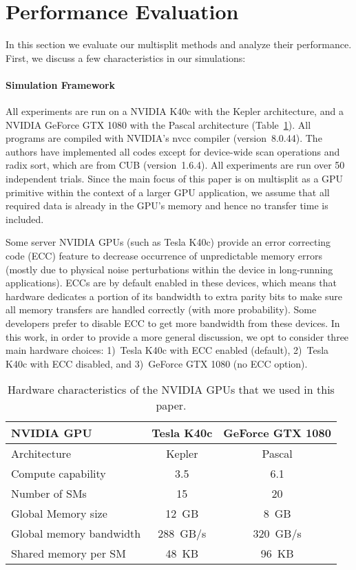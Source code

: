 \section{Performance Evaluation}\label{sec:perf_eval}
In this section we evaluate our multisplit methods and analyze their performance. First, we discuss a few characteristics in our simulations:

\paragraph{Simulation Framework}
All experiments are run on a NVIDIA K40c with the Kepler architecture, and a NVIDIA GeForce GTX 1080 with the Pascal architecture (Table~\ref{table:gpus}).
All programs are compiled with NVIDIA's nvcc compiler (version~8.0.44).
The authors have implemented all codes except for device-wide scan operations and radix sort, which are from CUB (version~1.6.4).
All experiments are run over 50 independent trials.
Since the main focus of this paper is on multisplit as a GPU primitive within the context of a larger GPU application, we assume that all required data is already in the GPU's memory and hence no transfer time is included.

Some server NVIDIA GPUs (such as Tesla K40c) provide an error correcting code (ECC) feature to decrease occurrence of unpredictable memory errors (mostly due to physical noise perturbations within the device in long-running applications).
ECCs are by default enabled in these devices, which means that hardware dedicates a portion of its bandwidth to extra parity bits to make sure all memory transfers are handled correctly (with more probability).
Some developers prefer to disable ECC to get more bandwidth from these devices.
In this work, in order to provide a more general discussion, we opt to consider three main hardware choices: 1)~Tesla K40c with ECC enabled (default), 2)~Tesla K40c with ECC disabled, and 3)~GeForce GTX 1080 (no ECC option).

\begin{table}
\centering
\scriptsize
\begin{tabular}{lcc}
\toprule
NVIDIA GPU & Tesla K40c & GeForce GTX 1080 \\
\midrule
Architecture    & Kepler & Pascal \\
Compute capability & 3.5 & 6.1 \\
Number of SMs & 15 & 20 \\
Global Memory size & 12~GB & 8~GB \\
Global memory bandwidth & 288~GB/s & 320~GB/s \\
Shared memory per SM & 48~KB & 96~KB \\
\bottomrule
\end{tabular}
\caption{Hardware characteristics of the NVIDIA GPUs that we used in this paper.}\label{table:gpus}
\end{table}
